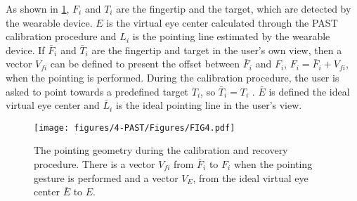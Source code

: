 {As shown in \figurename{ \ref{fig:fingertipOffset}}, $F_i$  and $T_i$  are the fingertip and the target, which are detected by the wearable device. $E$ is the virtual eye center calculated through the PAST calibration procedure and $L_i$ is the pointing line estimated by the wearable device. If $\bar F_i$ and $\bar T_i$ are the fingertip and target in the user's own view, then a vector $V_{fi}$ can be defined to present the offset between $\bar F_i$ and $F_i$, $F_i = {\bar F_i} + V_{fi}$, when the pointing is performed.
	During the calibration procedure, the user is asked to point towards a predefined target $T_i$, so ${\bar T_i} = T_i$ .
	$\bar E$ is defined the ideal virtual eye center and $\bar L_i$ is the ideal pointing line in the user's view. }
\begin{figure} 
	\centering
	\texttt{[image: figures/4-PAST/Figures/FIG4.pdf]}
	\caption{ The pointing geometry during the calibration and recovery procedure. There is a vector $V_{fi}$  from $\bar F_i$ to $F_i$ when the pointing gesture is performed and a vector $V_{E}$, from the ideal virtual eye center ${\bar E}$ to $E$.}
	\label{fig:fingertipOffset}
\end{figure}

